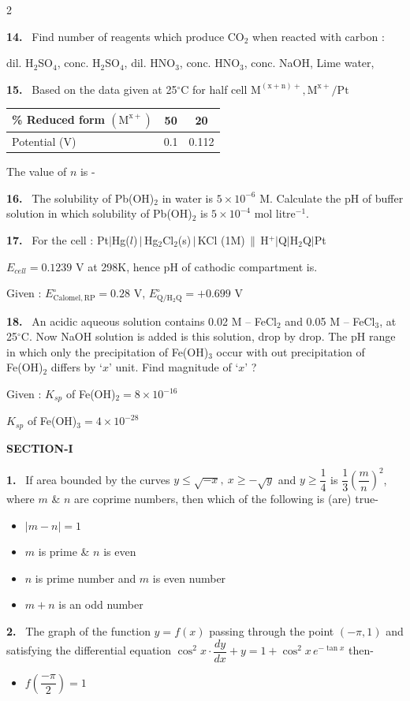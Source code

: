 \documentclass[10pt]{extarticle}
\newcommand{\partsec}[2]{\par\medskip\noindent{\large\bfseries PART-#1: #2}\par\smallskip}
\newcommand{\sect}[1]{\par\smallskip\noindent\textbf{#1}\par}
\newcommand{\qn}[1]{\par\smallskip\noindent\textbf{#1.}~}
\newenvironment{qoptions}{\begin{itemize}[leftmargin=1.8em,itemsep=1pt,topsep=2pt,label={}]}{\end{itemize}}
\newcommand{\opt}[2]{\item[(#1)] #2}
\begin{document}
\begin{multicols}{2}
\qn{14} Find number of reagents which produce CO$_2$ when reacted with carbon :\par
dil. H$_2$SO$_4$, conc. H$_2$SO$_4$, dil. HNO$_3$, conc. HNO$_3$, conc. NaOH, Lime water,
\qn{15} Based on the data given at 25$^\circ$C for half cell $\mathrm{M^{(x+n)+},M^{x+}/Pt}$\par
\begin{center}\begin{tabular}{|l|c|c|}\hline
\% Reduced form $(\mathrm{M^{x+}})$ & 50 & 20\\\hline
Potential (V) & 0.1 & 0.112\\\hline
\end{tabular}\end{center}
The value of $n$ is -
\qn{16} The solubility of Pb(OH)$_2$ in water is $5\times10^{-6}$ M. Calculate the pH of buffer solution in which solubility of Pb(OH)$_2$ is $5\times10^{-4}$ mol litre$^{-1}$.
\qn{17} For the cell : Pt$|$Hg($l$)$\,|\,$Hg$_2$Cl$_2$(s)$\,|\,$KCl (1M)$\,\|\,$H$^+|$Q$|$H$_2$Q$|$Pt\par
$E_{cell}=0.1239$ V at 298K, hence pH of cathodic compartment is.\par
Given : $E^\circ_{\mathrm{Calomel,RP}}=0.28$ V, $E^\circ_{\mathrm{Q/H_2Q}}=+0.699$ V
\qn{18} An acidic aqueous solution contains 0.02 M -- FeCl$_2$ and 0.05 M -- FeCl$_3$, at 25$^\circ$C. Now NaOH solution is added is this solution, drop by drop. The pH range in which only the precipitation of Fe(OH)$_3$ occur with out precipitation of Fe(OH)$_2$ differs by `$x$' unit. Find magnitude of `$x$' ?\par
Given : $K_{sp}$ of Fe(OH)$_2=8\times10^{-16}$\par
\hspace*{2.6em}$K_{sp}$ of Fe(OH)$_3=4\times10^{-28}$
\partsec{3}{MATHEMATICS}
\sect{SECTION-I}
\qn{1} If area bounded by the curves $y\le\sqrt{-x},\ x\ge-\sqrt y$ and $y\ge\dfrac14$ is $\dfrac13\left(\dfrac mn\right)^2$, where $m$ \& $n$ are coprime numbers, then which of the following is (are) true-
\begin{qoptions}
\opt{A}{$|m-n|=1$}
\opt{B}{$m$ is prime \& $n$ is even}
\opt{C}{$n$ is prime number and $m$ is even number}
\opt{D}{$m+n$ is an odd number}
\end{qoptions}
\qn{2} The graph of the function $y=f(x)$ passing through the point $(-\pi,1)$ and satisfying the differential equation $\cos^2x\cdot\dfrac{dy}{dx}+y=1+\cos^2x\,e^{-\tan x}$ then-
\begin{qoptions}
\opt{A}{$f\!\left(\dfrac{-\pi}2\right)=1$}

\end{qoptions}
\end{multicols}
\end{document}
